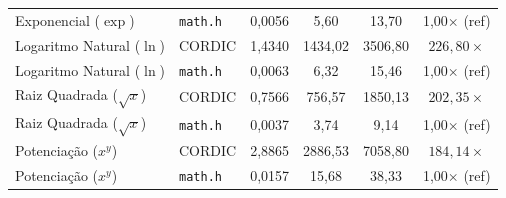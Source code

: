 \begin{table}[htbp]
{\begin{tabular}{llcccc}
Exponencial ($\exp$) & \texttt{math.h} & 0,0056 & 5,60 & 13,70 & 1{,}00$\times$ (ref) \\
Logaritmo Natural ($\ln$) & CORDIC & 1,4340 & 1434,02 & 3506,80 & $226,80\times$ \\
Logaritmo Natural ($\ln$) & \texttt{math.h} & 0,0063 & 6,32 & 15,46 & 1{,}00$\times$ (ref) \\
Raiz Quadrada ($\sqrt{x}$) & CORDIC & 0,7566 & 756,57 & 1850,13 & $202,35\times$ \\
Raiz Quadrada ($\sqrt{x}$) & \texttt{math.h} & 0,0037 & 3,74 & 9,14 & 1{,}00$\times$ (ref) \\
Potenciação ($x^y$) & CORDIC & 2,8865 & 2886,53 & 7058,80 & $184,14\times$ \\
Potenciação ($x^y$) & \texttt{math.h} & 0,0157 & 15,68 & 38,33 & 1{,}00$\times$ (ref) \\
\hline
\end{tabular}%
}
\end{table}